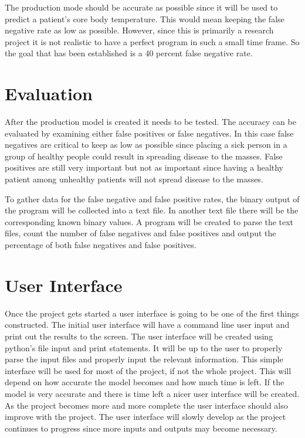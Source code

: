 \documentclass[onecolumn, draftclsnofoot,10pt, compsoc]{IEEEtran}
\begin{document}
The production mode should be accurate as possible since it will be used to predict a patient's core body temperature. This would mean keeping the false negative rate as low as possible. However, since this is primarily a research project it is not realistic to have a perfect program in such a small time frame. So the goal that has been established is a 40 percent false negative rate. \cite{BrianTech}


\section{Evaluation}

After the production model is created it needs to be tested. The accuracy can be evaluated by examining either false positives or false negatives. In this case false negatives are critical to keep as low as possible since placing a sick person in a group of healthy people could result in spreading disease to the masses. False positives are still very important but not as important since having a healthy patient among unhealthy patients will not spread disease to the masses.

To gather data for the false negative and false positive rates, the binary output of the program will be collected into a text file. In another text file there will be the corresponding known binary values. A program will be created to parse the text files, count the number of false negatives and false positives and output the percentage of both false negatives and false positives. 


\section{User Interface}
Once the project gets started a user interface is going to be one of the first things constructed. The initial user interface will have a command line user input and print out the results to the screen. The user interface will be created using python's file input and print statements. It will be up to the user to properly parse the input files and properly input the relevant information. This simple interface will be used for most of the project, if not the whole project. This will depend on how accurate the model becomes and how much time is left. If the model is very accurate and there is time left a nicer user interface will be created. As the project becomes more and more complete the user interface should also improve with the project. The user interface will slowly develop as the project continues to progress since more inputs and outputs may become necessary.
\end{document}
